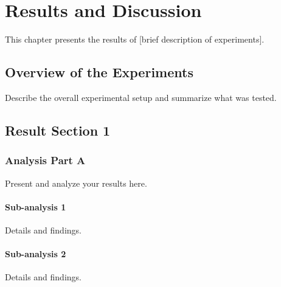 \chapter{Results and Discussion}


This chapter presents the results of [brief description of experiments].

\section{Overview of the Experiments}

Describe the overall experimental setup and summarize what was tested.


\section{Result Section 1}


\subsection{Analysis Part A}

Present and analyze your results here.

\subsubsection{Sub-analysis 1}
Details and findings.

\subsubsection{Sub-analysis 2}
Details and findings.

